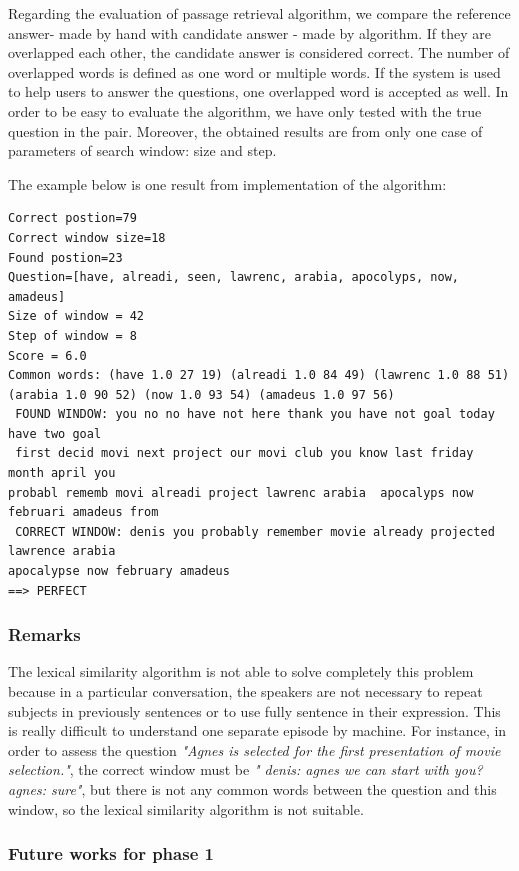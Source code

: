 \documentclass[12pt, a4paper]{report}
\begin{document}
Regarding the evaluation of passage retrieval algorithm, we compare the reference answer- made by hand with candidate answer - made by algorithm. If they are overlapped each other, the candidate answer is considered correct. The number of overlapped words is defined as one word or multiple words. If the system is used to help users to answer the questions, one overlapped word is accepted as well. In order to be easy to evaluate the algorithm, we have only tested with the true question in the pair. Moreover, the obtained results are from only one case of parameters of search window: size and step. 

The example below is one result from implementation of the algorithm:

\small
\begin{verbatim}  
Correct postion=79
Correct window size=18
Found postion=23
Question=[have, alreadi, seen, lawrenc, arabia, apocolyps, now, amadeus]
Size of window = 42
Step of window = 8
Score = 6.0
Common words: (have 1.0 27 19) (alreadi 1.0 84 49) (lawrenc 1.0 88 51) 
(arabia 1.0 90 52) (now 1.0 93 54) (amadeus 1.0 97 56) 
 FOUND WINDOW: you no no have not here thank you have not goal today have two goal
 first decid movi next project our movi club you know last friday month april you 
probabl rememb movi alreadi project lawrenc arabia  apocalyps now februari amadeus from 
 CORRECT WINDOW: denis you probably remember movie already projected lawrence arabia 
apocalypse now february amadeus 
==> PERFECT 
\end{verbatim}
\normalsize

\subsubsection{Remarks}
The lexical similarity algorithm is not able to solve completely this problem because in a particular conversation, the speakers are not necessary to repeat subjects in previously sentences or to use fully sentence in their expression. This is really difficult to understand one separate episode by machine. For instance, in order to assess the question \emph{"Agnes is selected for the first presentation of movie selection."}, the correct window must be \emph{" denis: agnes we can start with you? agnes: sure"}, but there is not any common words between the question and this window, so the lexical similarity algorithm is not suitable.

\subsubsection{Future works for phase 1}
\end{document}
